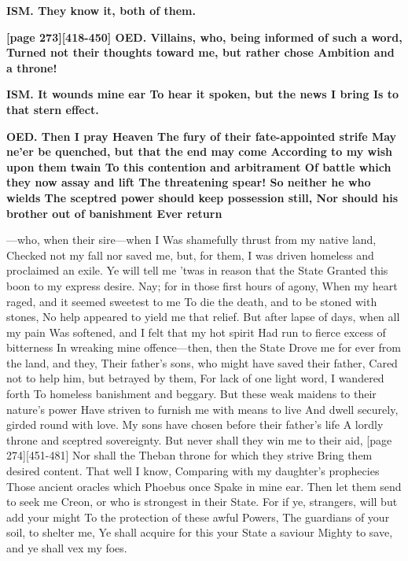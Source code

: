 \documentclass[11pt,letter]{book}
\begin{document}
\par \textbf{ISM. They know it, both of them.}
\par 

\par \textbf{[page 273][418-450] OED. Villains, who, being informed of such a word, Turned not their thoughts toward me, but rather chose Ambition and a throne!}
\par 

\par \textbf{ISM. It wounds mine ear To hear it spoken, but the news I bring Is to that stern effect.}
\par 

\par \textbf{OED. Then I pray Heaven The fury of their fate-appointed strife May ne’er be quenched, but that the end may come According to my wish upon them twain To this contention and arbitrament Of battle which they now assay and lift The threatening spear! So neither he who wields The sceptred power should keep possession still, Nor should his brother out of banishment Ever return}
\par  —who, when their sire—when I Was shamefully thrust from my native land, Checked not my fall nor saved me, but, for them, I was driven homeless and proclaimed an exile. Ye will tell me ’twas in reason that the State Granted this boon to my express desire. Nay; for in those first hours of agony, When my heart raged, and it seemed sweetest to me To die the death, and to be stoned with stones, No help appeared to yield me that relief. But after lapse of days, when all my pain Was softened, and I felt that my hot spirit Had run to fierce excess of bitterness In wreaking mine offence—then, then the State Drove me for ever from the land, and they, Their father’s sons, who might have saved their father, Cared not to help him, but betrayed by them, For lack of one light word, I wandered forth To homeless banishment and beggary. But these weak maidens to their nature’s power Have striven to furnish me with means to live And dwell securely, girded round with love. My sons have chosen before their father’s life A lordly throne and sceptred sovereignty. But never shall they win me to their aid, [page 274][451-481] Nor shall the Theban throne for which they strive Bring them desired content. That well I know, Comparing with my daughter’s prophecies Those ancient oracles which Phoebus once Spake in mine ear. Then let them send to seek me Creon, or who is strongest in their State. For if ye, strangers, will but add your might To the protection of these awful Powers, The guardians of your soil, to shelter me, Ye shall acquire for this your State a saviour Mighty to save, and ye shall vex my foes.
\end{document}
